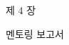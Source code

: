
\begin{titlepage}
\thispagestyle{empty}

\centering

\vspace{1cm}

\Huge 제 4 장

\vspace{2.5cm}

{\fontsize{42pt}{42pt}
    멘토링 보고서
    \par
}

\end{titlepage}